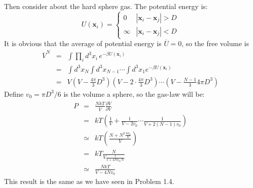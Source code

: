 \documentclass{article}
\begin{document}
Then consider about the hard sphere gas. The potential energy is:
$$
U(\mathbf{x}_i)=\left\{\begin{array}{ll}
0 &|\mathbf{x}_i-\mathbf{x}_j| > D\\
\infty &|\mathbf{x}_i-\mathbf{x}_j| < D
\end{array}\right.
$$
It is obvious that the average of potential energy is $\overline{U} = 0$, so the free volume is
\begin{eqnarray}
\overline{V}^N&=&\int \prod_i d^3x_i\,e^{-\beta U(\mathbf{x}_i)}\nonumber\\
&=&\int d^3x_N\int d^3x_{N-1}\cdots \int d^3x_1 e^{-\beta U(\mathbf{x}_i)}\nonumber\\
&=&V\left(V-\frac{4\pi}{3}D^3\right)\left(V-2\cdot\frac{4\pi}{3}D^3\right)\cdots\left(V-\frac{N-1}{3}4\pi D^3\right)
\end{eqnarray}
Define $v_0 = \pi D^3/6$ is the volume a sphere, so the gas-law will be:
\begin{eqnarray}
P &=& \frac{NkT}{\overline{V}}\frac{\partial \overline{V}}{\partial V}\nonumber\\
&=& kT\left(\frac{1}{V}+\frac{1}{V-2v_0}\cdots \frac{1}{V+2(N-1)v_0}\right)\nonumber\\
&\simeq & kT\left(\frac{N+N^2\frac{4v_0}{V}}{V}\right)\nonumber\\
&=& kT\frac{N}{V\frac{1}{1+4Nv_0/V}}\nonumber\\
&\simeq &\frac{NkT}{V-4Nv_0}
\end{eqnarray}
This result is the same as we have seen in Problem 1.4.
\end{document}
